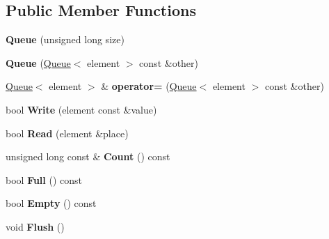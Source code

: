 \subsection*{Public Member Functions}
\begin{DoxyCompactItemize}
\item 
\hypertarget{class_queue_a256e88956da8b5ddc7f6d90d727f538c}{{\bfseries Queue} (unsigned long size)}\label{class_queue_a256e88956da8b5ddc7f6d90d727f538c}

\item 
\hypertarget{class_queue_ac8171f81b3093b504e1104377b59dd32}{{\bfseries Queue} (\hyperlink{class_queue}{Queue}$<$ element $>$ const \&other)}\label{class_queue_ac8171f81b3093b504e1104377b59dd32}

\item 
\hypertarget{class_queue_abb78a25b02ff057bd3b26d26b204d416}{\hyperlink{class_queue}{Queue}$<$ element $>$ \& {\bfseries operator=} (\hyperlink{class_queue}{Queue}$<$ element $>$ const \&other)}\label{class_queue_abb78a25b02ff057bd3b26d26b204d416}

\item 
\hypertarget{class_queue_a3e0762c8eb05b6827c11479b3a9336e8}{bool {\bfseries Write} (element const \&value)}\label{class_queue_a3e0762c8eb05b6827c11479b3a9336e8}

\item 
\hypertarget{class_queue_acab1a9e80352e68015c766fe3f248dde}{bool {\bfseries Read} (element \&place)}\label{class_queue_acab1a9e80352e68015c766fe3f248dde}

\item 
\hypertarget{class_queue_a567a1d3ef0fe69ac7c69f8e8e6ff1f2f}{unsigned long const \& {\bfseries Count} () const }\label{class_queue_a567a1d3ef0fe69ac7c69f8e8e6ff1f2f}

\item 
\hypertarget{class_queue_a62c3248fdf4323d379257cbd3ca6d287}{bool {\bfseries Full} () const }\label{class_queue_a62c3248fdf4323d379257cbd3ca6d287}

\item 
\hypertarget{class_queue_ab6515d56835268bae34a771200d98b56}{bool {\bfseries Empty} () const }\label{class_queue_ab6515d56835268bae34a771200d98b56}

\item 
\hypertarget{class_queue_a33ed714d4bf650e42fe963c4981d925e}{void {\bfseries Flush} ()}\label{class_queue_a33ed714d4bf650e42fe963c4981d925e}

\end{DoxyCompactItemize}
